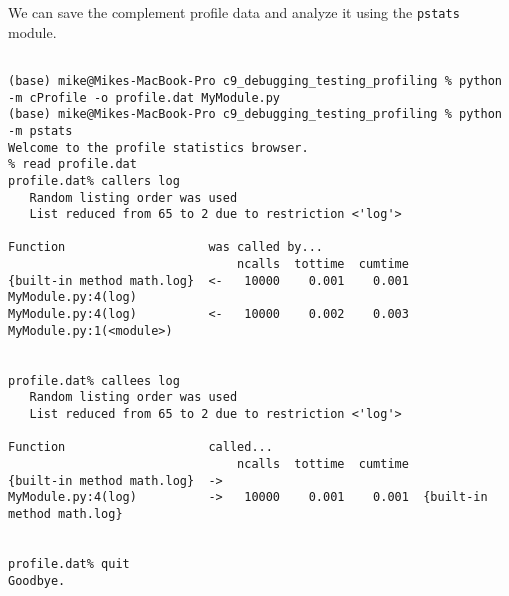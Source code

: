 We can save the complement profile data and analyze it using the \verb|pstats| module.

\begin{lstlisting}

(base) mike@Mikes-MacBook-Pro c9_debugging_testing_profiling % python -m cProfile -o profile.dat MyModule.py
(base) mike@Mikes-MacBook-Pro c9_debugging_testing_profiling % python -m pstats                             
Welcome to the profile statistics browser.
% read profile.dat
profile.dat% callers log
   Random listing order was used
   List reduced from 65 to 2 due to restriction <'log'>

Function                    was called by...
                                ncalls  tottime  cumtime
{built-in method math.log}  <-   10000    0.001    0.001  MyModule.py:4(log)
MyModule.py:4(log)          <-   10000    0.002    0.003  MyModule.py:1(<module>)


profile.dat% callees log
   Random listing order was used
   List reduced from 65 to 2 due to restriction <'log'>

Function                    called...
                                ncalls  tottime  cumtime
{built-in method math.log}  -> 
MyModule.py:4(log)          ->   10000    0.001    0.001  {built-in method math.log}


profile.dat% quit
Goodbye.
  
\end{lstlisting}


